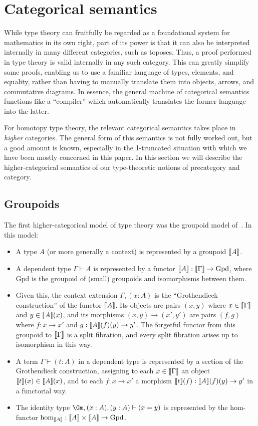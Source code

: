 \section{Categorical semantics}
\label{sec:semantics}

While type theory can fruitfully be regarded as a foundational system for mathematics in its own right, part of its power is that it can also be interpreted internally in many different categories, such as toposes.
Thus, a proof performed in type theory is valid internally in any such category.
This can greatly simplify some proofs, enabling us to use a familiar language of types, elements, and equality, rather than having to manually translate them into objects, arrows, and commutative diagrams.
In essence, the general machine of categorical semantics functions like a ``compiler'' which automatically translates the former language into the latter.

For homotopy type theory, the relevant categorical semantics takes place in \emph{higher} categories.
The general form of this semantics is not fully worked out, but a good amount is known, especially in the 1-truncated situation with which we have been mostly concerned in this paper.
In this section we will describe the higher-categorical semantics of our type-theoretic notions of precategory and category.

\subsection{Groupoids}
\label{sec:groupoids}

The first higher-categorical model of type theory was the groupoid model of~\cite{hs:gpd-typethy}.
In this model:
\begin{itemize}
\item A type $A$ (or more generally a context) is represented by a groupoid $\llbracket A\rrbracket$.
\item A dependent type $\Gamma\vdash A$ is represented by a functor $\llbracket A\rrbracket :\llbracket\Gamma\rrbracket \to \mathrm{Gpd}$, where $\mathrm{Gpd}$ is the groupoid of (small) groupoids and isomorphisms between them.
\item Given this, the context extension $\Gamma,(x:A)$ is the ``Grothendieck construction'' of the functor $\llbracket A\rrbracket$.
  Its objects are pairs $(x,y)$ where $x\in\llbracket\Gamma\rrbracket$ and $y\in \llbracket A\rrbracket(x)$, and its morphisms $(x,y)\to(x',y')$ are pairs $(f,g)$ where $f:x\to x'$ and $g:\llbracket A\rrbracket(f)(y) \to y'$.
  The forgetful functor from this groupoid to $\llbracket\Gamma\rrbracket$ is a split fibration, and every split fibration arises up to isomorphism in this way.
\item A term $\Gamma \vdash (t:A)$ in a dependent type is represented by a section of the Grothendieck construction, assigning to each $x\in\llbracket\Gamma\rrbracket$ an object $\llbracket t\rrbracket(x)\in \llbracket A\rrbracket(x)$, and to each $f:x\to x'$ a morphism $\llbracket t\rrbracket(f):\llbracket A\rrbracket(f)(y) \to y'$ in a functorial way.
\item The identity type $\Gm,(x:A),(y:A)\vdash (x=y)$ is represented by the hom-functor $\hom_{\llbracket A\rrbracket}: \llbracket A\rrbracket \times \llbracket A\rrbracket \to \mathrm{Gpd}$.
\end{itemize}



